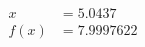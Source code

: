 \documentclass[preview]{standalone}
\begin{document}
\begin{align*}
x &= 5.0437\\f(x) &= 7.9997622
\end{align*}
\end{document}

